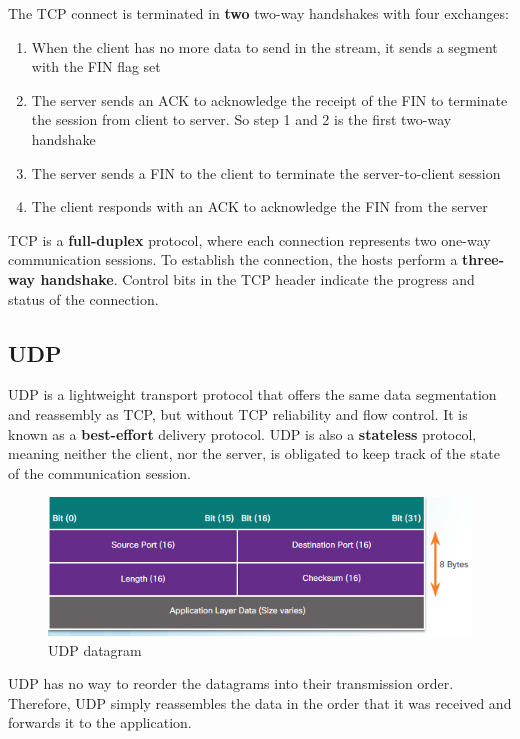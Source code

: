 The TCP connect is terminated in \textbf{two} two-way handshakes with four exchanges:

\begin{enumerate}
\item When the client has no more data to send in the stream, it sends a segment with the FIN flag set 
\item The server sends an ACK to acknowledge the receipt of the FIN to terminate the session from client to server. So step 1 and 2 is the first two-way handshake
\item The server sends a FIN to the client to terminate the server-to-client session
\item The client responds with an ACK to acknowledge the FIN from the server
\end{enumerate}

TCP is a \textbf{full-duplex} protocol, where each connection represents two one-way communication sessions. To establish the connection, the hosts perform a \textbf{three-way handshake}. Control bits in the TCP header indicate the progress and status of the connection. 

\subsection{UDP}

UDP is a lightweight transport protocol that offers the same data segmentation and reassembly as TCP, but without TCP reliability and flow control. It is known as a \textbf{best-effort} delivery protocol. UDP is also a \textbf{stateless} protocol, meaning neither the client, nor the server, is obligated to keep track of the state of the communication session.\\

\begin{figure}[hbtp]
\caption{UDP datagram}\label{UDPheader}
\centering
\includegraphics[scale=0.5]{pictures/UDPheader.PNG}
\end{figure}


UDP has no way to reorder the datagrams into their transmission order. Therefore, UDP simply reassembles the data in the order that it was received and forwards it to the application. \\

